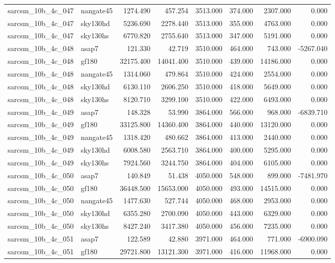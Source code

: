 \begin{tabular}{llrrrrrr}
sarcsm\_10b\_4c\_047 & nangate45 & 1274.490 & 457.254 & 3513.000 & 374.000 & 2307.000 & 0.000 \\
sarcsm\_10b\_4c\_047 & sky130hd & 5236.690 & 2278.440 & 3513.000 & 355.000 & 4763.000 & 0.000 \\
sarcsm\_10b\_4c\_047 & sky130hs & 6770.820 & 2755.640 & 3513.000 & 347.000 & 5191.000 & 0.000 \\
sarcsm\_10b\_4c\_048 & asap7 & 121.330 & 42.719 & 3510.000 & 464.000 & 743.000 & -5267.040 \\
sarcsm\_10b\_4c\_048 & gf180 & 32175.400 & 14041.400 & 3510.000 & 439.000 & 14186.000 & 0.000 \\
sarcsm\_10b\_4c\_048 & nangate45 & 1314.060 & 479.864 & 3510.000 & 424.000 & 2554.000 & 0.000 \\
sarcsm\_10b\_4c\_048 & sky130hd & 6130.110 & 2606.250 & 3510.000 & 418.000 & 5649.000 & 0.000 \\
sarcsm\_10b\_4c\_048 & sky130hs & 8120.710 & 3299.100 & 3510.000 & 422.000 & 6493.000 & 0.000 \\
sarcsm\_10b\_4c\_049 & asap7 & 148.328 & 53.990 & 3864.000 & 566.000 & 968.000 & -6839.710 \\
sarcsm\_10b\_4c\_049 & gf180 & 33125.800 & 14360.400 & 3864.000 & 440.000 & 13120.000 & 0.000 \\
sarcsm\_10b\_4c\_049 & nangate45 & 1318.420 & 480.662 & 3864.000 & 413.000 & 2440.000 & 0.000 \\
sarcsm\_10b\_4c\_049 & sky130hd & 6008.580 & 2563.710 & 3864.000 & 400.000 & 5295.000 & 0.000 \\
sarcsm\_10b\_4c\_049 & sky130hs & 7924.560 & 3244.750 & 3864.000 & 404.000 & 6105.000 & 0.000 \\
sarcsm\_10b\_4c\_050 & asap7 & 140.849 & 51.438 & 4050.000 & 548.000 & 899.000 & -7481.970 \\
sarcsm\_10b\_4c\_050 & gf180 & 36448.500 & 15653.000 & 4050.000 & 493.000 & 14515.000 & 0.000 \\
sarcsm\_10b\_4c\_050 & nangate45 & 1477.630 & 527.744 & 4050.000 & 468.000 & 2953.000 & 0.000 \\
sarcsm\_10b\_4c\_050 & sky130hd & 6355.280 & 2700.090 & 4050.000 & 443.000 & 6329.000 & 0.000 \\
sarcsm\_10b\_4c\_050 & sky130hs & 8427.240 & 3417.380 & 4050.000 & 456.000 & 7235.000 & 0.000 \\
sarcsm\_10b\_4c\_051 & asap7 & 122.589 & 42.880 & 3971.000 & 464.000 & 771.000 & -6900.090 \\
sarcsm\_10b\_4c\_051 & gf180 & 29721.800 & 13121.300 & 3971.000 & 416.000 & 11968.000 & 0.000 \\

\end{tabular}

